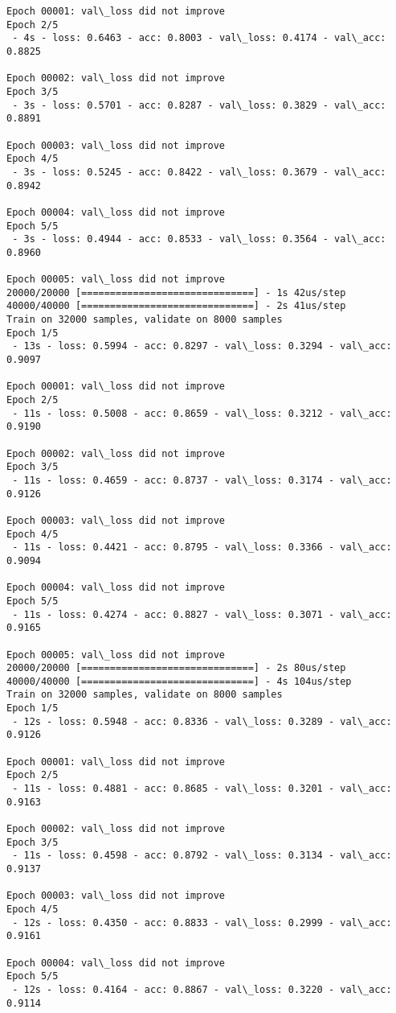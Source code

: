\documentclass[11pt]{article}
\begin{document}
\begin{Verbatim}[commandchars=\\\{\}]
Epoch 00001: val\_loss did not improve
Epoch 2/5
 - 4s - loss: 0.6463 - acc: 0.8003 - val\_loss: 0.4174 - val\_acc: 0.8825

Epoch 00002: val\_loss did not improve
Epoch 3/5
 - 3s - loss: 0.5701 - acc: 0.8287 - val\_loss: 0.3829 - val\_acc: 0.8891

Epoch 00003: val\_loss did not improve
Epoch 4/5
 - 3s - loss: 0.5245 - acc: 0.8422 - val\_loss: 0.3679 - val\_acc: 0.8942

Epoch 00004: val\_loss did not improve
Epoch 5/5
 - 3s - loss: 0.4944 - acc: 0.8533 - val\_loss: 0.3564 - val\_acc: 0.8960

Epoch 00005: val\_loss did not improve
20000/20000 [==============================] - 1s 42us/step
40000/40000 [==============================] - 2s 41us/step
Train on 32000 samples, validate on 8000 samples
Epoch 1/5
 - 13s - loss: 0.5994 - acc: 0.8297 - val\_loss: 0.3294 - val\_acc: 0.9097

Epoch 00001: val\_loss did not improve
Epoch 2/5
 - 11s - loss: 0.5008 - acc: 0.8659 - val\_loss: 0.3212 - val\_acc: 0.9190

Epoch 00002: val\_loss did not improve
Epoch 3/5
 - 11s - loss: 0.4659 - acc: 0.8737 - val\_loss: 0.3174 - val\_acc: 0.9126

Epoch 00003: val\_loss did not improve
Epoch 4/5
 - 11s - loss: 0.4421 - acc: 0.8795 - val\_loss: 0.3366 - val\_acc: 0.9094

Epoch 00004: val\_loss did not improve
Epoch 5/5
 - 11s - loss: 0.4274 - acc: 0.8827 - val\_loss: 0.3071 - val\_acc: 0.9165

Epoch 00005: val\_loss did not improve
20000/20000 [==============================] - 2s 80us/step
40000/40000 [==============================] - 4s 104us/step
Train on 32000 samples, validate on 8000 samples
Epoch 1/5
 - 12s - loss: 0.5948 - acc: 0.8336 - val\_loss: 0.3289 - val\_acc: 0.9126

Epoch 00001: val\_loss did not improve
Epoch 2/5
 - 11s - loss: 0.4881 - acc: 0.8685 - val\_loss: 0.3201 - val\_acc: 0.9163

Epoch 00002: val\_loss did not improve
Epoch 3/5
 - 11s - loss: 0.4598 - acc: 0.8792 - val\_loss: 0.3134 - val\_acc: 0.9137

Epoch 00003: val\_loss did not improve
Epoch 4/5
 - 12s - loss: 0.4350 - acc: 0.8833 - val\_loss: 0.2999 - val\_acc: 0.9161

Epoch 00004: val\_loss did not improve
Epoch 5/5
 - 12s - loss: 0.4164 - acc: 0.8867 - val\_loss: 0.3220 - val\_acc: 0.9114


\end{Verbatim}
\end{document}
